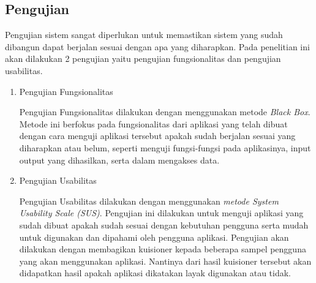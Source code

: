 \subsection{Pengujian}
Pengujian sistem sangat diperlukan untuk memastikan sistem yang sudah dibangun dapat berjalan sesuai dengan apa yang diharapkan. Pada penelitian ini akan dilakukan 2 pengujian yaitu pengujian fungsionalitas dan pengujian usabilitas.

\begin{enumerate}
\item Pengujian Fungsionalitas
\par Pengujian Fungsionalitas dilakukan dengan menggunakan metode \textit{Black Box}. Metode ini berfokus pada fungsionalitas dari aplikasi yang telah dibuat dengan cara menguji aplikasi tersebut apakah sudah berjalan sesuai yang diharapkan atau belum, seperti menguji fungsi-fungsi pada aplikasinya, input output yang dihasilkan, serta dalam mengakses data.
\item Pengujian Usabilitas
\par Pengujian Usabilitas dilakukan dengan menggunakan \textit{metode System Usability Scale (SUS)}. Pengujian ini dilakukan untuk menguji aplikasi yang sudah dibuat apakah sudah sesuai dengan kebutuhan pengguna serta mudah untuk digunakan dan dipahami oleh pengguna aplikasi. Pengujian akan dilakukan dengan membagikan kuisioner kepada beberapa sampel pengguna yang akan menggunakan aplikasi. Nantinya dari hasil kuisioner tersebut akan didapatkan hasil apakah aplikasi dikatakan layak digunakan atau tidak. 
\end{enumerate}


